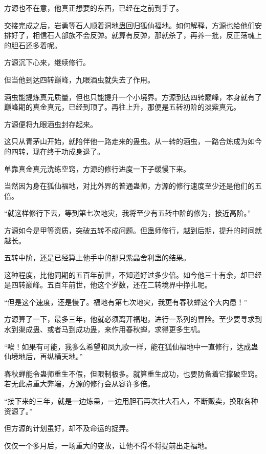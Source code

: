 \begin{this_body}
方源也不在意，他真正想要的东西，已经在之前到手了。

交接完成之后，岩勇等石人顺着洞地蛊回归狐仙福地。如何解释，方源也给他们安排好了，相信石人部族不会反弹。就算有反弹，那就杀了，再养一批，反正荡魂上的胆石还多着呢。

方源沉下心来，继续修行。

但当他到达四转巅峰，九眼酒虫就失去了作用。

酒虫能提炼真元质量，但也只能提升一个小境界。方源到达四转巅峰，本身就有了巅峰期的真金真元，已经到顶了。再往上升，那便是五转初阶的淡紫真元。

方源便将九眼酒虫封存起来。

这只从青茅山开始，就陪伴他一路走来的蛊虫。从一转的酒虫，一路合炼成为如今的四转，现在终于功成身退了。

单靠真金真元洗练空窍，方源的修行进度一下子缓慢下来。

当然因为身在狐仙福地，对比外界的普通蛊师，方源的修行速度至少还是他们的五倍。

“就这样修行下去，等到第七次地灾，我将至少有五转中阶的修为，接近高阶。”

方源如今是甲等资质，突破五转不成问题。但蛊师修行，越到后期，提升的时间就越长。

五转中阶，还是已经算上他手中的那只紫晶舍利蛊的结果。

这种程度，比他同期的五百年前世，不知道好过多少倍。如今他三十有余，却已经是四转巅峰。五百年前世，他这个岁数，还在二转境界中挣扎呢。

“但是这个速度，还是慢了。福地有第七次地灾，我更有春秋蝉这个大内患！”

方源算了一下，最多三年，他就必须离开福地，进行一系列的冒险。至少要寻求到水到渠成蛊、或者马到成功蛊，来作用春秋蝉，求得更多生机。

“唉！如果有可能，我多么希望和凤九歌一样，能在狐仙福地中一直修行，达成蛊仙境地后，再纵横天地。”

春秋蝉能令蛊师重生不假，但限制极多。就算重生成功，也要防备着它撑破空窍。若无此点重大弊端，方源的修行会从容许多倍。

“接下来的三年，就是一边炼蛊，一边用胆石再次壮大石人，不断贩卖，换取各种资源了。”

但方源的计划虽好，却不及命运的捉弄。

仅仅一个多月后，一场重大的变故，让他不得不将提前出走福地。

\end{this_body}

